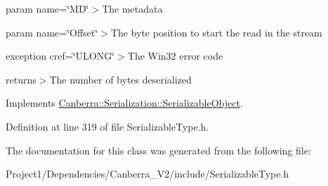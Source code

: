 param name=\char`\"{}\+M\+D\char`\"{}$>$The metadata

param name=\char`\"{}\+Offset\char`\"{}$>$The byte position to start the read in the stream

exception cref=\char`\"{}\+U\+L\+O\+N\+G\char`\"{}$>$The Win32 error code

returns$>$The number of bytes deserialized

Implements \hyperlink{class_canberra_1_1_serialization_1_1_serializable_object}{Canberra\+::\+Serialization\+::\+Serializable\+Object}.



Definition at line 319 of file Serializable\+Type.\+h.



The documentation for this class was generated from the following file\+:\begin{DoxyCompactItemize}
\item 
Project1/\+Dependencies/\+Canberra\+\_\+\+V2/include/Serializable\+Type.\+h\end{DoxyCompactItemize}
